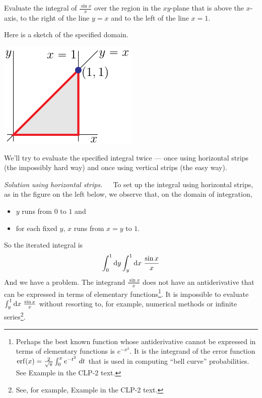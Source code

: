 \begin{eg}\label{eg dblInt E}
Evaluate the integral of $\frac{\sin x}{x}$ over the region in the 
$xy$-plane that is above the $x$-axis, to the right of the line
$y=x$ and to the left of the line $x=1$. 

\soln Here is a sketch of the specified domain.
\begin{efig}
\begin{center}
   \includegraphics{reverse2A.pdf}
\end{center}
\end{efig}
We'll try to evaluate the specified integral twice --- once using
horizontal strips (the impossibly hard way) and once using 
vertical strips (the easy way).

\medskip\noindent\emph{Solution using horizontal strips.}\ \ \
To set up the integral using horizontal strips, as in the figure on
the left below, we observe that, on the domain of integration,
\begin{itemize}
\item
$y$ runs from $0$ to $1$ and
\item
for each fixed $y$, $x$ runs from $x=y$ to $1$.
\end{itemize}
So the iterated integral is
\begin{equation*}
\int_0^1\mathrm{d}y\int_y^1\mathrm{d}x\ \frac{\sin x}{x}
\end{equation*}
And we have a problem. The integrand $\frac{\sin x}{x}$ does not have
an antiderivative that can be expressed in terms of elementary 
functions\footnote{Perhaps the best known function whose antiderivative
cannot be expressed in terms of elementary functions is $e^{-x^2}$.
It is the integrand of the error function
$
\erf(x) =\frac{2}{\sqrt{\pi}}\int_0^x e^{-t^2}\ dt
$
that is used in computing ``bell curve'' probabilities. See Example
\eref{CLP101}{eg:erf} in the CLP-2 text.}.
It is impossible to evaluate $\int_y^1\mathrm{d}x\ \frac{\sin x}{x}$ without
resorting to, for example, numerical methods or 
infinite series\footnote{See, for example,  
Example  in the CLP-2 text.}.


\end{eg}
